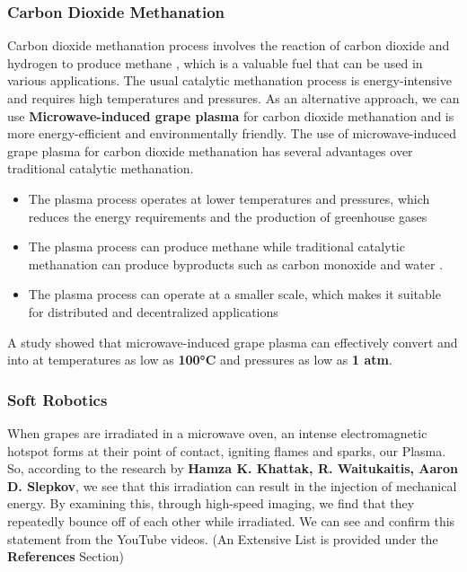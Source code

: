 \documentclass{article}
\begin{document}
\subsubsection{\Large Carbon Dioxide Methanation}
Carbon dioxide methanation process involves the reaction of carbon dioxide  and hydrogen  to produce methane , which is a valuable fuel that can be used in various applications. The usual catalytic methanation process is energy-intensive and requires high temperatures and pressures. As an alternative approach, we can use \textbf{Microwave-induced grape plasma} for carbon dioxide methanation and is more energy-efficient and environmentally friendly. 
The use of microwave-induced grape plasma for carbon dioxide methanation has several advantages over traditional catalytic methanation. 
\begin{itemize}
    \item \normalsize The plasma process operates at lower temperatures and pressures, which reduces the energy requirements and the production of greenhouse gases
    \item \normalsize The plasma process can produce methane  while traditional catalytic methanation can produce byproducts such as carbon monoxide  and water  .
    \item \normalsize The plasma process can operate at a smaller scale, which makes it suitable for distributed and decentralized applications
\end{itemize}

A study showed that microwave-induced grape plasma can effectively convert  and  into  at temperatures as low as \textbf {100°C} and pressures as low as \textbf {1 atm}.\cite{7}


\subsubsection{\Large Soft Robotics}
\large
When grapes are irradiated in a microwave oven, an intense electromagnetic hotspot forms at their point of contact, igniting flames and sparks, our Plasma. So, according to the research by \textbf{Hamza K. Khattak, R. Waitukaitis, Aaron D. Slepkov},\cite{4} we see that this irradiation can result in the injection of mechanical energy. By examining this, through high-speed imaging, we find that they repeatedly bounce off of each other while irradiated. We can see and confirm this statement from the YouTube videos. (An Extensive List is provided under the \textbf{References} Section)
\end{document}
